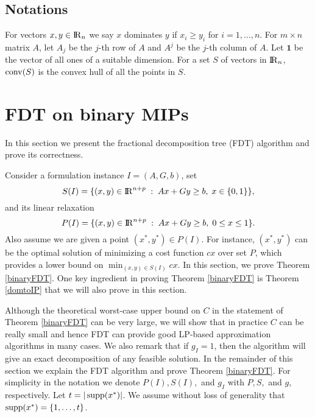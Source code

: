 \documentclass[runningheads]{llncs}
\begin{document}
\subsection{Notations}
For vectors $x,y\in {\rm I\!R}_{n}$ we say $x$ dominates $y$ if $x_i\geq y_i$ for $i= 1,\ldots,n$. For $m\times n$ matrix $A$, let $A_j$ be the $j$-th row of $A$ and $A^j$ be the $j$-th column of $A$. Let $\textbf{1}$ be the vector of all ones of a suitable dimension. For a set $S$ of vectors in ${\rm I\!R}_{n}$, $\operatorname{conv}(S)$ is the convex hull of all the points in $S$.


\section{FDT on binary MIPs}
\label{binaryfdt}

In this section we present the fractional decomposition tree (FDT) algorithm and prove its correctness. 

Consider a formulation instance $I=(A,G,b)$, set 
\begin{equation}
S(I)= \{(x,y)\in {\rm I\!R}^{n+ p}\;:\; Ax+Gy\geq b,\; x\in \{0,1\}\},  \label{S'}
\end{equation}
and its linear relaxation
\begin{equation}
P(I) = \{(x,y)\in {\rm I\!R}^{n+ p}\;:\; Ax+Gy\geq b,\; 0 \leq x\leq 1\}. \label{P'}
\end{equation}
Also assume we are given a point $(x^*,y^*)\in P(I)$. For instance, $(x^*,y^*)$ can be the optimal solution of minimizing a cost function $cx$ over set $P$, which provides a lower bound on $\min_{(x,y)\in S(I)} cx$. In this section, we prove Theorem \ref{binaryFDT}.  One key ingredient in proving Theorem \ref{binaryFDT} is Theorem \ref{domtoIP} that we will also prove in this section.



Although the theoretical worst-case upper bound on $C$ in the statement of Theorem \ref{binaryFDT} can be very large, we will show that in practice $C$ can be really small and hence FDT can provide good LP-based approximation algorithms in many cases. We also remark that if $g_I=1$, then the algorithm will give an exact decomposition of any feasible solution.  In the remainder of this section we explain the FDT algorithm and prove Theorem \ref{binaryFDT}. For simplicity in the notation we denote $P(I),S(I),$ and $g_I$ with $P,S,$ and $g$, respectively. Let $t=|\operatorname{supp}(x^*)|$. We assume without loss of generality that $\operatorname{supp}(x^*)= \{1,\ldots,t\}$.
\end{document}
